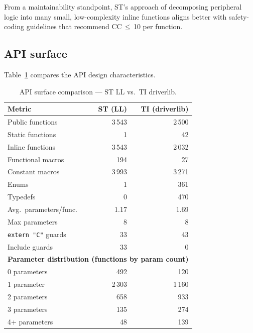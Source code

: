 From a maintainability standpoint, ST's approach of decomposing peripheral logic into many
small, low-complexity inline functions aligns better with safety-coding guidelines that
recommend CC\,$\leq$\,10 per function.

\subsection{API surface}
\label{subsec:ti-api}

Table~\ref{tab:ti-api} compares the API design characteristics.

\begin{table}[H]
\centering
\caption{API surface comparison --- ST LL vs.\ TI driverlib.}
\label{tab:ti-api}
\begin{tabular}{l r r}
\toprule
\textbf{Metric} & \textbf{ST (LL)} & \textbf{TI (driverlib)} \\
\midrule
Public functions         &    3\,543 &    2\,500 \\
Static functions         &         1 &        42 \\
Inline functions         &    3\,543 &    2\,032 \\
Functional macros        &       194 &        27 \\
Constant macros          &     3\,993 &    3\,271 \\
Enums                    &         1 &       361 \\
Typedefs                 &         0 &       470 \\
\midrule
Avg.\ parameters/func.  &      1.17 &      1.69 \\
Max parameters           &         8 &         8 \\
\texttt{extern "C"} guards &    33 &        43 \\
Include guards           &        33 &         0 \\
\midrule
\multicolumn{3}{l}{\textbf{Parameter distribution (functions by param count)}} \\
0 parameters             &       492 &       120 \\
1 parameter              &     2\,303 &     1\,160 \\
2 parameters             &       658 &       933 \\
3 parameters             &       135 &       274 \\
4+ parameters            &        48 &       139 \\
\bottomrule
\end{tabular}
\end{table}

